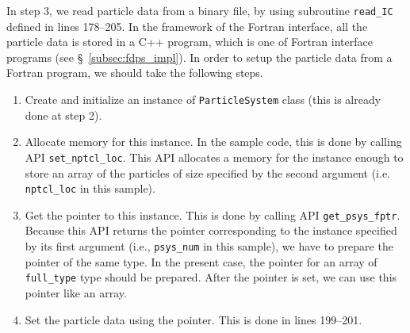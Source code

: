 \documentclass[proof,useamsfonts]{pasj01}
\begin{document}
In step 3, we read particle data from a binary file, by using subroutine \texttt{read\_IC} defined in lines 178--205. In the framework of the Fortran interface, all the particle data is stored in a C++ program, which is one of Fortran interface programs (see \S~\ref{subsec:fdps_impl}). In order to setup the particle data from a Fortran program, we should take the following steps.
\begin{enumerate}[label=(\roman*)]
\item Create and initialize an instance of \texttt{ParticleSystem} class (this is already done at step 2).
\item Allocate memory for this instance. In the sample code, this is done by calling API \texttt{set\_nptcl\_loc}. This API allocates a memory for the instance enough to store an array of the particles of size specified by the second argument (i.e. \texttt{nptcl\_loc} in this sample).
\item Get the pointer to this instance. This is done by calling API \texttt{get\_psys\_fptr}. Because this API returns the pointer corresponding to the instance specified by its first argument (i.e., \texttt{psys\_num} in this sample), we have to prepare the pointer of the same type. In the present case, the pointer for an array of \texttt{full\_type} type should be prepared. After the pointer is set, we can use this pointer like an array.
\item Set the particle data using the pointer. This is done in lines 199--201.
\end{enumerate}
\end{document}
